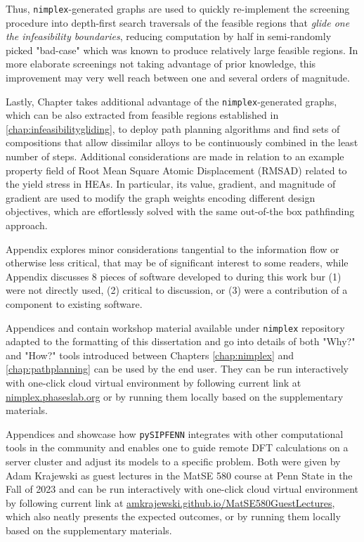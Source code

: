 Thus, \texttt{nimplex}-generated graphs are used to quickly re-implement the screening procedure into depth-first search traversals of the feasible regions that \emph{glide one the infeasibility boundaries}, reducing computation by half in semi-randomly picked "bad-case" which was known to produce relatively large feasible regions. In more elaborate screenings not taking advantage of prior knowledge, this improvement may very well reach between one and several orders of magnitude.


Lastly, Chapter  takes additional advantage of the \texttt{nimplex}-generated graphs, which can be also extracted from feasible regions established in \ref{chap:infeasibilitygliding}, to deploy path planning algorithms and find sets of compositions that allow dissimilar alloys to be continuously combined in the least number of steps. Additional considerations are made in relation to an example property field of Root Mean Square Atomic Displacement (RMSAD) related to the yield stress in HEAs. In particular, its value, gradient, and magnitude of gradient are used to modify the graph weights encoding different design objectives, which are effortlessly solved with the same out-of-the box pathfinding approach.


Appendix  explores minor considerations tangential to the information flow or otherwise less critical, that may be of significant interest to some readers, while Appendix  discusses 8 pieces of software developed to during this work bur (1) were not directly used, (2) critical to discussion, or (3) were a contribution of a component to existing software.

Appendices  and  contain workshop material available under \texttt{nimplex} repository adapted to the formatting of this dissertation and go into details of both "Why?" and "How?" tools introduced between Chapters \ref{chap:nimplex} and \ref{chap:pathplanning} can be used by the end user. They can be run interactively with one-click cloud virtual environment by following current link at \href{https://nimplex.phaseslab.org}{nimplex.phaseslab.org} or by running them locally based on the supplementary materials.

Appendices  and  showcase how \texttt{pySIPFENN} integrates with other computational tools in the community and enables one to guide remote DFT calculations on a server cluster and adjust its models to a specific problem. Both were given by Adam Krajewski as guest lectures in the MatSE 580 course at Penn State in the Fall of 2023 and can be run interactively with one-click cloud virtual environment by following current link at \href{https://amkrajewski.github.io/MatSE580GuestLectures}{amkrajewski.github.io/MatSE580GuestLectures}, which also neatly presents the expected outcomes, or by running them locally based on the supplementary materials.

\printbibliography[heading=subbibintoc]